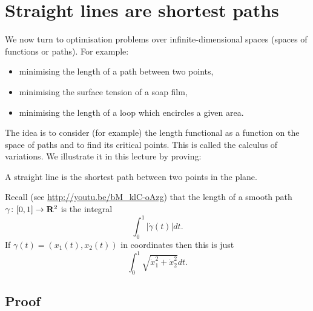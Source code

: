 
\chapter[Straight lines]{Straight lines are shortest paths}
\label{ch:straight-lines}

We now turn to optimisation problems over infinite-dimensional spaces (spaces of functions or paths). For example:
\begin{itemize}
\item minimising the length of a path between two points,
\item minimising the surface tension of a soap film,
\item minimising the length of a loop which encircles a given area.
\end{itemize}
The idea is to consider (for example) the length functional as a function on the space of paths and to find its critical points. This is called the calculus of variations. We illustrate it in this lecture by proving:

\begin{thm}
A straight line is the shortest path between two points in the plane.
\end{thm}
Recall (see \url{http://youtu.be/bM_klC-oAzg}) that the length of a smooth path $\gamma\colon[0,1]\to\mathbf{R}^2$ is the integral
\[\int_0^1|\dot{\gamma}(t)|dt.\]
If $\gamma(t)=(x_1(t),x_2(t))$ in coordinates then this is just
\[\int_0^1\sqrt{\dot{x}_1^2+\dot{x}_2^2}dt.\]

\section{Proof}

